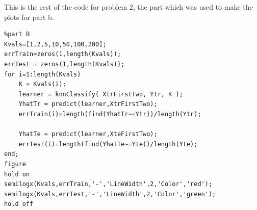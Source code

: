 \documentclass[11pt,psfig]{article}
\begin{document}
\newpage

This is the rest of the code for problem 2, the part which was used to make the plots for part b. 

\begin{verbatim}
%part B
Kvals=[1,2,5,10,50,100,200];
errTrain=zeros(1,length(Kvals));
errTest = zeros(1,length(Kvals));
for i=1:length(Kvals)
    K = Kvals(i);
    learner = knnClassify( XtrFirstTwo, Ytr, K );
    YhatTr = predict(learner,XtrFirstTwo);
    errTrain(i)=length(find(YhatTr~=Ytr))/length(Ytr);
    
    YhatTe = predict(learner,XteFirstTwo);
    errTest(i)=length(find(YhatTe~=Yte))/length(Yte);
end;
figure
hold on
semilogx(Kvals,errTrain,'-','LineWidth',2,'Color','red');
semilogx(Kvals,errTest,'-','LineWidth',2,'Color','green');
hold off
\end{verbatim}
\end{document}
